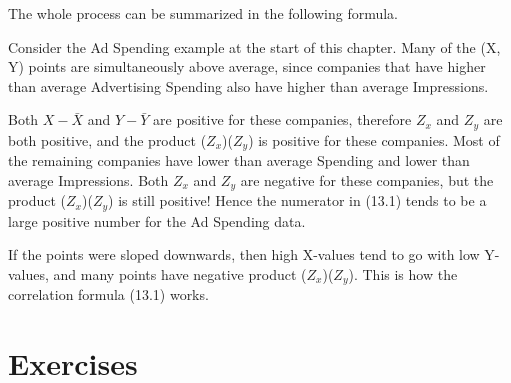 \documentclass[11pt, chapterprefix=true]{scrbook}\usepackage[]{graphicx}\usepackage[]{color}
\begin{document}
The whole process can be summarized in the following formula.

\begin{center}
\end{center}

Consider the Ad Spending example at the start of this chapter.  Many of the (X, Y) points are simultaneously above average, since companies that have higher than average Advertising Spending also have higher than average Impressions.  

Both $X - \bar{X}$  and $Y - \bar{Y}$ are positive for these companies, therefore $Z_x$  and $Z_y$  are both positive, and the product ($Z_x$)($Z_y$)  is positive for these companies.  Most of the remaining companies have lower than average Spending and lower than average Impressions.  Both $Z_x$  and $Z_y$  are negative for these companies, but the product ($Z_x$)($Z_y$) is still positive!  Hence the numerator in (13.1) tends to be a large positive number for the Ad Spending data.

If the points were sloped downwards, then high X-values tend to go with low Y-values, and many points have negative product ($Z_x$)($Z_y$).  This is how the correlation formula (13.1) works.  


\twocolumn

\section{Exercises}
\end{document}
